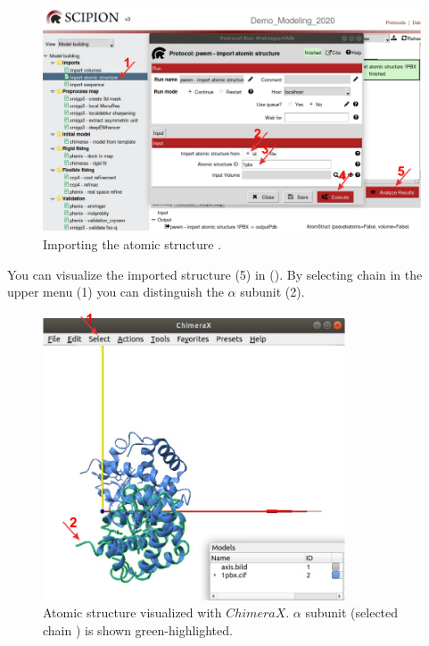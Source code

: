   \begin{figure}[H]
  \centering 
  \captionsetup{width=.9\linewidth} 
  \includegraphics[width=1\textwidth]{Images/Fig10}
  \caption{Importing the atomic structure .}
  \label{fig:import_atomic_structure}
  \end{figure}
  You can visualize the imported structure (5) in \chimera (). By selecting chain  in the \chimera upper menu (1) you can distinguish the  $\alpha$ subunit (2).
  \begin{figure}[H]
  \centering 
  \captionsetup{width=.8\linewidth} 
  \includegraphics[width=0.80\textwidth]{Images/Fig11}
  \caption{Atomic structure  visualized with $ChimeraX$.  $\alpha$ subunit (selected chain ) is shown green-highlighted.}
  \label{fig:chimera_visualization_structure}
  \end{figure}
  
